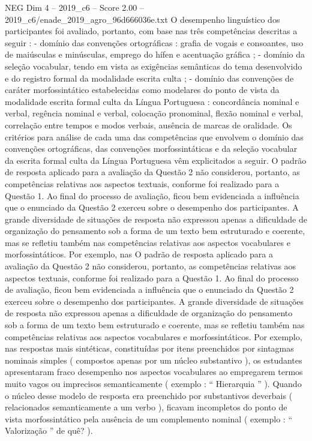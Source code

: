 \begin{textsample}{NEG Dim 4 – 2019\_c6 – Score 2.00 – 2019\_c6/enade\_2019\_agro\_96d666036e.txt}
O desempenho linguístico dos participantes foi avaliado, portanto, com base nas três competências descritas a seguir : - domínio das convenções ortográficas : grafia de vogais e consoantes, uso de maiúsculas e minúsculas, emprego do hífen e acentuação gráfica ; - domínio da seleção vocabular, tendo em vista as exigências semânticas do tema desenvolvido e do registro formal da modalidade escrita culta ; - domínio das convenções de caráter morfossintático estabelecidas como modelares do ponto de vista da modalidade escrita formal culta da Língua Portuguesa : concordância nominal e verbal, regência nominal e verbal, colocação pronominal, flexão nominal e verbal, correlação entre tempos e modos verbais, ausência de marcas de oralidade.
Os critérios para análise de cada uma das competências que envolvem o domínio das convenções ortográficas, das convenções morfossintáticas e da seleção vocabular da escrita formal culta da Língua Portuguesa vêm explicitados a seguir.
O padrão de resposta aplicado para a avaliação da Questão 2 não considerou, portanto, as competências relativas aos aspectos textuais, conforme foi realizado para a Questão 1.
Ao final do processo de avaliação, ficou bem evidenciada a influência que o enunciado da Questão 2 exerceu sobre o desempenho dos participantes.
A grande diversidade de situações de resposta não expressou apenas a dificuldade de organização do pensamento sob a forma de um texto bem estruturado e coerente, mas se refletiu também nas competências relativas aos aspectos vocabulares e morfossintáticos.
Por exemplo, nas O padrão de resposta aplicado para a avaliação da Questão 2 não considerou, portanto, as competências relativas aos aspectos textuais, conforme foi realizado para a Questão 1.
Ao final do processo de avaliação, ficou bem evidenciada a influência que o enunciado da Questão 2 exerceu sobre o desempenho dos participantes.
A grande diversidade de situações de resposta não expressou apenas a dificuldade de organização do pensamento sob a forma de um texto bem estruturado e coerente, mas se refletiu também nas competências relativas aos aspectos vocabulares e morfossintáticos.
Por exemplo, nas respostas mais sintéticas, constituídas por itens preenchidos por sintagmas nominais simples ( compostos apenas por um núcleo substantivo ), os estudantes apresentaram fraco desempenho nos aspectos vocabulares ao empregarem termos muito vagos ou imprecisos semanticamente ( exemplo : “ Hierarquia ” ).
Quando o núcleo desse modelo de resposta era preenchido por substantivos deverbais ( relacionados semanticamente a um verbo ), ficavam incompletos do ponto de vista morfossintático pela ausência de um complemento nominal ( exemplo : “ Valorização ” de quê? ).

\end{textsample}
